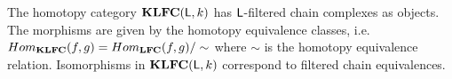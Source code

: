 The homotopy category ${\bf K}{\bf LFC}({\mathsf L},k)$ has ${\mathsf L}$-filtered chain complexes as objects.
The morphisms are given by the homotopy equivalence classes, i.e.\ $Hom_{{\bf K}{\bf LFC}}(f,g) = Hom_{{\bf LFC}}(f,g)/\sim$ where $\sim$ is the homotopy equivalence relation.   
Isomorphisms in ${\bf K}{\bf LFC}({\mathsf L},k)$ correspond to filtered chain equivalences.





%
%
%
%
%
%
